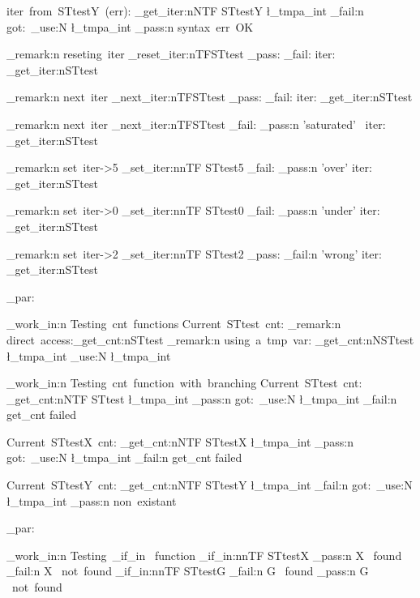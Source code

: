 \documentclass{article}
\begin{document}
iter~from~STtestY~(err): 
\starray_get_iter:nNTF {STtestY} \l_tmpa_int 
  {\sttests_fail:n {got:~\int_use:N \l_tmpa_int}}
  {\sttests_pass:n {syntax~err~OK}}

\sttests_remark:n {reseting~iter} 
\starray_reset_iter:nTF{STtest}
  {\sttests_pass:}
  {\sttests_fail:}
iter: \starray_get_iter:n{STtest}

\sttests_remark:n {next~iter} 
\starray_next_iter:nTF{STtest}
  {\sttests_pass:}
  {\sttests_fail:}
iter: \starray_get_iter:n{STtest}

\sttests_remark:n {next~iter} 
\starray_next_iter:nTF{STtest}
  {\sttests_fail:}
  {\sttests_pass:n {'saturated'}~}
iter: \starray_get_iter:n{STtest}

\sttests_remark:n {set~iter->5} 
\starray_set_iter:nnTF {STtest}{5}
  {\sttests_fail:}
  {\sttests_pass:n {'over'}}
iter: \starray_get_iter:n{STtest}

\sttests_remark:n {set~iter->0} 
\starray_set_iter:nnTF {STtest}{0}
  {\sttests_fail:}
  {\sttests_pass:n {'under'}}
iter: \starray_get_iter:n{STtest}

\sttests_remark:n {set~iter->2} 
\starray_set_iter:nnTF {STtest}{2}
  {\sttests_pass:}
  {\sttests_fail:n {'wrong'}}
iter: \starray_get_iter:n{STtest}

\sttests_par:

\sttests_work_in:n {Testing~cnt~functions}
Current~STtest~cnt: 
\sttests_remark:n {direct~access:\starray_get_cnt:n{STtest}}
\sttests_remark:n {using~a~tmp~var: \starray_get_cnt:nN{STtest} \l_tmpa_int \int_use:N \l_tmpa_int}

\sttests_work_in:n {Testing~cnt~function~with~branching}
Current~STtest~cnt: 
\starray_get_cnt:nNTF {STtest} \l_tmpa_int 
  {\sttests_pass:n {got:~\int_use:N \l_tmpa_int}}
  {\sttests_fail:n {get_cnt failed}}

Current~STtestX~cnt: 
\starray_get_cnt:nNTF {STtestX} \l_tmpa_int 
  {\sttests_pass:n {got:~\int_use:N \l_tmpa_int}}
  {\sttests_fail:n {get_cnt failed}}

Current~STtestY~cnt: 
\starray_get_cnt:nNTF {STtestY} \l_tmpa_int 
  {\sttests_fail:n {got:~\int_use:N \l_tmpa_int}}
  {\sttests_pass:n {non~existant}}

\sttests_par:

\sttests_work_in:n {Testing~_if_in ~function}
\starray_if_in:nnTF {STtest}{X}
  {\sttests_pass:n {X ~found}}
  {\sttests_fail:n {X ~not~found}}
\starray_if_in:nnTF {STtest}{G}
  {\sttests_fail:n {G ~found}}
  {\sttests_pass:n {G ~not~found}}
\end{document}
